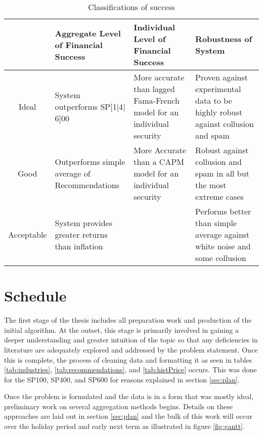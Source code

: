 \begin{table}[p]
    \centering
    \begin{tabularx}{0.95\textwidth}{@{\extracolsep{\fill}}cXXX}
        \toprule\toprule
         & Aggregate Level of Financial Success  &Individual Level of Financial Success & Robustness of System \\\midrule
        Ideal & System outperforms SP[1$|$4$|$6]00 & More accurate than lagged Fama-French model for an individual security & Proven against experimental data to be highly robust against collusion and spam\\
        \addlinespace
        Good & Outperforms simple average of Recommendations & More Accurate than a CAPM model for an individual security & Robust against collusion and spam in all but the most extreme cases\\
        \addlinespace
        Acceptable & System provides greater returns than inflation && Performs better than simple average against white noise and some collusion \\ \bottomrule
    \end{tabularx}
    \caption[Classifications of success]{Classifications of success  }
    \label{tab:success}
\end{table}


\section{Schedule}\label{sec:schedule}
The first stage of the thesis includes all preparation work and production of the initial algorithm. At the outset, this stage is primarily involved in gaining a deeper understanding and greater intuition of the topic so that any deficiencies in literature are adequately explored and addressed by the problem statement. Once this is complete, the process of cleaning data and formatting it as seen in tables \ref{tab:industries}, \ref{tab:recommendations}, and \ref{tab:histPrice} occurs. This was done for the SP100, SP400, and SP600 for reasons explained in section \ref{sec:plan}. 

Once the problem is formulated and the data is in a form that was mostly ideal, preliminary work on several aggregation methods begins. Details on these approaches are laid out in section \ref{sec:plan} and the bulk of this work will occur over the holiday period and early next term as illustrated in figure \ref{fig:gantt}.

